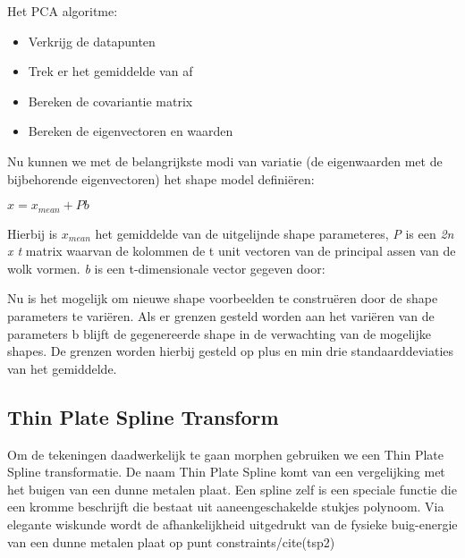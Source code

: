 Het PCA algoritme:
\begin{itemize}
\item Verkrijg de datapunten
\item Trek er het gemiddelde van af
\item Bereken de covariantie matrix
\item Bereken de eigenvectoren en waarden
\end{itemize}

Nu kunnen we met de belangrijkste modi van variatie (de eigenwaarden met de bijbehorende eigenvectoren) het shape model defini\"{e}ren:

$x = x_{mean} + Pb$

Hierbij is $x_{mean}$ het gemiddelde van de uitgelijnde shape parameteres, \textit{P} is een \textit{2n x t} matrix waarvan de kolommen de t unit vectoren van de principal assen van de wolk vormen. \textit{b} is een t-dimensionale vector gegeven door:


Nu is het mogelijk om nieuwe shape voorbeelden te constru\"{e}ren door de shape parameters te vari\"{e}ren. Als er grenzen gesteld worden aan het vari\"{e}ren van de parameters b blijft de gegenereerde shape in de verwachting van de mogelijke shapes. De grenzen worden hierbij gesteld op plus en min drie standaarddeviaties van het gemiddelde.


\subsection{Thin Plate Spline Transform}
Om de tekeningen daadwerkelijk te gaan morphen gebruiken we een Thin Plate Spline transformatie. De naam Thin Plate Spline 
komt van een vergelijking met het buigen van een dunne metalen plaat.\cite{tsp} 
Een spline zelf is een speciale functie die een kromme beschrijft die bestaat uit aaneengeschakelde stukjes polynoom.
Via elegante wiskunde wordt de afhankelijkheid uitgedrukt van de fysieke buig-energie van een dunne metalen plaat op punt constraints/cite(tsp2)